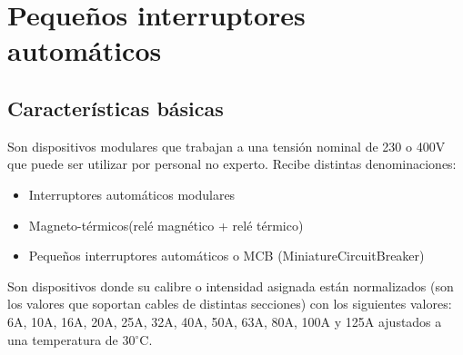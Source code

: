 \chapter{Pequeños interruptores automáticos}
\section{Características básicas}
Son dispositivos modulares que trabajan a una tensión nominal de 230 o 400V que puede ser utilizar por personal no experto. Recibe distintas denominaciones:
\begin{itemize}
	\item Interruptores automáticos modulares
	\item Magneto-térmicos(relé magnético + relé térmico)
	\item Pequeños interruptores automáticos o MCB (MiniatureCircuitBreaker)
\end{itemize}

Son dispositivos donde su calibre o intensidad asignada están normalizados (son los valores que soportan cables de distintas secciones) con los siguientes valores: 6A, 10A, 16A, 20A, 25A, 32A, 40A, 50A, 63A, 80A, 100A y 125A ajustados a una temperatura de 30$^\circ$C.
\newline

